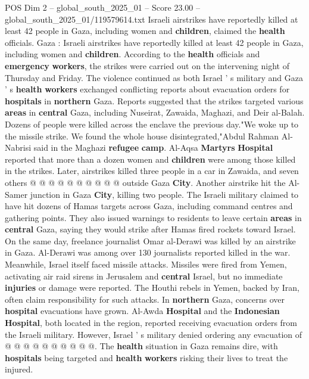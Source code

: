\begin{textsample}{POS Dim 2 – global\_south\_2025\_01 – Score 23.00 – global\_south\_2025\_01/119579614.txt}  \label{ex:f2_pos_320}
Israeli airstrikes have reportedly killed at least 42 people in Gaza, including women and \textbf{children}, claimed the \textbf{health} officials.
Gaza : Israeli airstrikes have reportedly killed at least 42 people in Gaza, including women and \textbf{children}.
According to the \textbf{health} officials and \textbf{emergency} \textbf{workers}, the strikes were carried out on the intervening night of Thursday and Friday.
The violence continued as both Israel ' s military and Gaza ' s \textbf{health} \textbf{workers} exchanged conflicting reports about evacuation orders for \textbf{hospitals} in \textbf{northern} Gaza.
Reports suggested that the strikes targeted various \textbf{areas} in \textbf{central} Gaza, including Nuseirat, Zawaida, Maghazi, and Deir al-Balah.
Dozens of people were killed across the enclave the previous day."We woke up to the missile strike.
We found the whole house disintegrated,"Abdul Rahman Al-Nabrisi said in the Maghazi \textbf{refugee} \textbf{camp}.
Al-Aqsa \textbf{Martyrs} \textbf{Hospital} reported that more than a dozen women and \textbf{children} were among those killed in the strikes.
Later, airstrikes killed three people in a car in Zawaida, and seven others @ @ @ @ @ @ @ @ @ @ outside Gaza \textbf{City}.
Another airstrike hit the Al-Samer junction in Gaza \textbf{City}, killing two people.
The Israeli military claimed to have hit dozens of Hamas targets across Gaza, including command centres and gathering points.
They also issued warnings to residents to leave certain \textbf{areas} in \textbf{central} Gaza, saying they would strike after Hamas fired rockets toward Israel.
On the same day, freelance journalist Omar al-Derawi was killed by an airstrike in Gaza.
Al-Derawi was among over 130 journalists reported killed in the war.
Meanwhile, Israel itself faced missile attacks.
Missiles were fired from Yemen, activating air raid sirens in Jerusalem and \textbf{central} Israel, but no immediate \textbf{injuries} or damage were reported.
The Houthi rebels in Yemen, backed by Iran, often claim responsibility for such attacks.
In \textbf{northern} Gaza, concerns over \textbf{hospital} evacuations have grown.
Al-Awda \textbf{Hospital} and the \textbf{Indonesian} \textbf{Hospital}, both located in the region, reported receiving evacuation orders from the Israeli military.
However, Israel ' s military denied ordering any evacuation of @ @ @ @ @ @ @ @ @ @.
The \textbf{health} situation in Gaza remains dire, with \textbf{hospitals} being targeted and \textbf{health} \textbf{workers} risking their lives to treat the injured.

\end{textsample}
